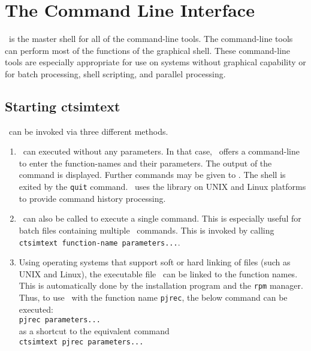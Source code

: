 \chapter{The Command Line Interface}\label{ctsimtext}
%
\ctsimfooter%

\ctsimtext\ is the master shell for all of the command-line tools. The
command-line tools can perform most of the functions of the graphical
shell. These command-line tools are especially appropriate for use on
systems without graphical capability or for batch processing, shell scripting,
and parallel processing.

\section{Starting ctsimtext}
\ctsimtext\ can be invoked via three different
methods.
\begin{enumerate}\itemsep=3pt
\item \ctsimtext\ can executed without any parameters. In that case,
\ctsimtext\ offers a command-line to enter the function-names and
their parameters. The output of the command is displayed. Further
commands may be given to \ctsimtext. The shell is exited by the
\texttt{quit} command. \ctsimtext\ uses the
 library on UNIX and Linux platforms
to provide command history processing.

\item \ctsimtext\ can also be called to
execute a single command. This is especially useful for batch
files containing multiple \ctsimtext\ commands. This is invoked by
calling\\ \texttt{ctsimtext function-name parameters...}.

\item Using operating systems that support soft or hard linking of
files (such as UNIX and Linux), the executable file \ctsimtext\ can
be linked to the function names. This is automatically done by
the installation program and the \texttt{rpm} manager. Thus, to use \ctsimtext\ with the
function name \texttt{pjrec}, the below command can be executed:\\
\hspace*{1.5cm}\texttt{pjrec parameters...} \\
as a shortcut to the equivalent command \\
\hspace*{1.5cm}\texttt{ctsimtext pjrec parameters...}

\end{enumerate}

